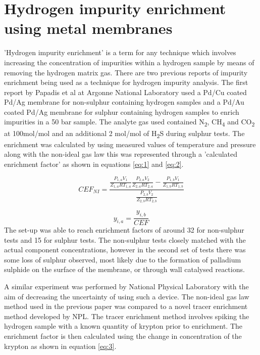 \section{Hydrogen impurity enrichment using metal membranes}\label{enrichlit}
'Hydrogen impurity enrichment' is a term for any technique which involves increasing the concentration of impurities within a hydrogen sample by means of removing the hydrogen matrix gas. There are two previous reports of impurity enrichment being used as a technique for hydrogen impurity 
analysis. The first report by Papadis et al at Argonne National Laboratory used a Pd/Cu \cite{Ahmed2010} coated Pd/Ag membrane for non-sulphur containing hydrogen samples and a Pd/Au coated Pd/Ag membrane for sulphur 
containing hydrogen samples to enrich impurities in a 50 bar sample. The analyte gas used contained N\textsubscript{2}, CH\textsubscript{4} and CO\textsubscript{2} at 100\textmu mol/mol and an additional 
 2 \textmu mol/mol of H\textsubscript{2}S during sulphur tests. 
The enrichment was calculated by using measured values of temperature and pressure along with the non-ideal gas law this was represented through a 'calculated enrichment factor' as shown in equations \ref{eq:1}
and \ref{eq:2}. 

\begin{equation} \label{eq:1}
    CEF_{NI} = \frac{\frac{P_{1,a} V_1}{Z_{1,a}RT_{1,a}}\frac{P_{2,a} V_2}{Z_{2,a}RT_{2,a}}-\frac{P_{1,b} V_1}{Z_{1,b}RT_{1,b}}}{\frac{P_{2,b} V_2}{Z_{2,b}RT_{2,b}}}
\end{equation}

\begin{equation}\label{eq:2}
    y_{i,a} = \frac{y_{i,b}}{CEF}
\end{equation}
The set-up was able to reach enrichment factors of around 32 for non-sulphur tests and 15 
for sulphur tests. The non-sulphur tests closely matched with the actual component concentrations, 
however in the second set of tests there was some loss of sulphur observed, most likely due to the 
formation of palladium sulphide on the surface of the membrane, or through wall catalysed reactions. 

A similar experiment was performed by National Physical Laboratory with the aim of decreasing the uncertainty 
of using such a device. \cite{Murugan2014} The non-ideal gas law method used in the previous paper \cite{Ahmed2010} 
was compared to a novel tracer enrichment method developed by NPL. \cite{Murugan2014} 
The tracer enrichment method involves spiking the hydrogen sample with a known quantity of krypton prior to 
enrichment. The enrichment factor is then calculated using the change in concentration of the krypton as 
shown in equation \ref{eq:3}.

